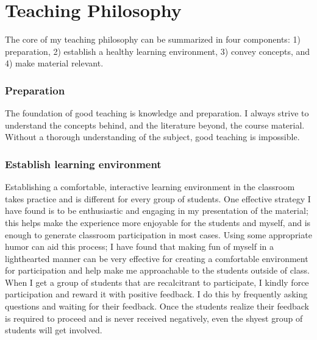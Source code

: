 \documentclass[10pt]{article}
\begin{document}
\raggedright
\singlespacing

\section*{Teaching Philosophy}
The core of my teaching philosophy can be summarized in four components:
1) preparation,
2) establish a healthy learning environment,
3) convey concepts, and
4) make material relevant.

\subsubsection*{Preparation}
The foundation of good teaching is knowledge and preparation.
I always strive to understand the concepts behind, and the literature beyond, the course material.
Without a thorough understanding of the subject, good teaching is impossible.

\subsubsection*{Establish learning environment}
Establishing a comfortable, interactive learning environment in the classroom takes practice and is different for every group of students.
One effective strategy I have found is to be enthusiastic and engaging in my presentation of the material; this helps make the experience more enjoyable for the students and myself, and is enough to generate classroom participation in most cases.
Using some appropriate humor can aid this process; I have found that making fun of myself in a lighthearted manner can be very effective for creating a comfortable environment for participation and help make me approachable to the students outside of class.
When I get a group of students that are recalcitrant to participate, I kindly force participation and reward it with positive feedback.
I do this by frequently asking questions and waiting for their feedback.
Once the students realize their feedback is required to proceed and is never received negatively, even the shyest group of students will get involved.
\end{document}

